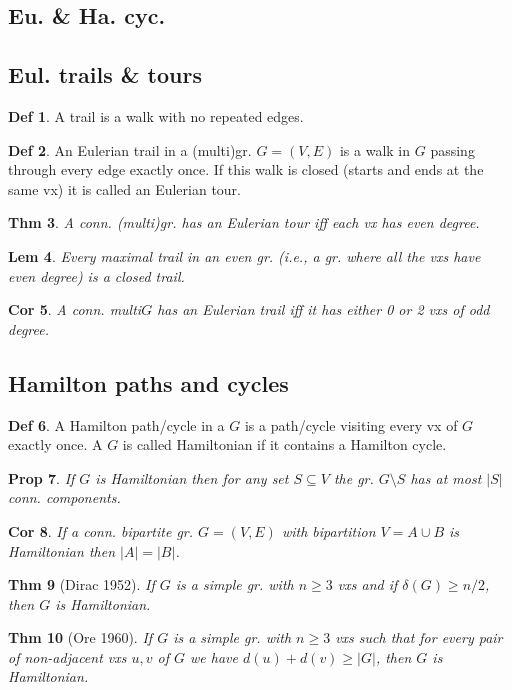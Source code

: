 \documentclass[11pt, fleqn, a4paper, landscape]{article}
\theoremstyle{plain} %
\newtheorem{thm}{Thm}
\newtheorem{lem}[thm]{Lem}
\newtheorem{pro}[thm]{Prop}
\newtheorem{cor}[thm]{Cor}
\theoremstyle{remark} %
\theoremstyle{definition} %
\newtheorem{defi}[thm]{Def}
\begin{document}
\begin{multicols}{5}
\section{Eu. \& Ha. cyc.}
\subsection{Eul. trails \& tours}
\addtocounter{thm}{1}
\begin{defi}
A trail is a walk with no repeated edges.
\end{defi}

\begin{defi}
An Eulerian trail in a (multi)gr. $G = (V,E)$ is a walk in $G$ passing through every edge exactly once. If this walk is closed (starts and ends at the same vx) it is called an Eulerian tour.
\end{defi}
\addtocounter{thm}{1}
\begin{thm}
A conn. (multi)gr. has an Eulerian tour iff each vx has even degree.
\end{thm}

\begin{lem}
Every maximal trail in an even gr. (i.e., a gr. where all the vxs have even degree) is a closed trail.
\end{lem} 

\begin{cor}
A conn. multi$G$ has an Eulerian trail iff it has either 0 or 2 vxs of odd degree.
\end{cor}

\subsection{Hamilton paths and cycles}
\begin{defi}
A Hamilton path/cycle in a $G$ is a path/cycle visiting every vx of $G$ exactly once. A $G$ is called Hamiltonian if it contains a Hamilton cycle.
\end{defi}
\addtocounter{thm}{1}
\begin{pro}
If $G$ is Hamiltonian then for any set $S \subseteq V$ the gr. $G\setminus S$ has at most $|S|$ conn. components.
\end{pro}

\begin{cor}
If a conn. bipartite gr. $G = (V,E)$ with bipartition $V = A\cup B$ is Hamiltonian then $|A|=|B|$.
\end{cor}
\addtocounter{thm}{1}
\begin{thm}[Dirac 1952]
If $G$ is a simple gr. with $n \ge 3$ vxs and if $\delta(G) \ge n/2$, then $G$ is Hamiltonian.
\end{thm}
\addtocounter{thm}{1}
\begin{thm}[Ore 1960]
If $G$ is a simple gr. with $n\ge 3$ vxs such that for every pair of
non-adjacent vxs $u, v$ of $G$ we have $d(u) + d(v)\ge |G|$, then $G $ is Hamiltonian.
\end{thm}

\end{multicols}
\end{document}
